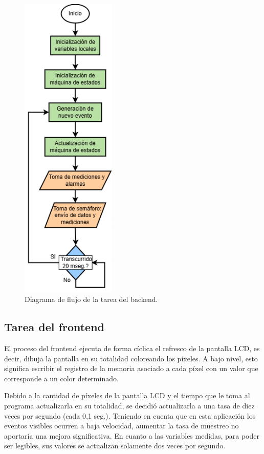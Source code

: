 \begin{figure}[H]
\centering
\includegraphics[width=0.4\textwidth]{./Figures/flowTaskApp.png}
\caption{Diagrama de flujo de la tarea del backend.}
\label{fig:taskApp}
\end{figure}

\subsection{Tarea del frontend}

El proceso del frontend ejecuta de forma cíclica el refresco de la pantalla LCD, es decir, dibuja la pantalla en su totalidad coloreando los píxeles. A bajo nivel, esto significa escribir el registro de la memoria asociado a cada píxel con un valor que corresponde a un color determinado. 

Debido a la cantidad de píxeles de la pantalla LCD y el tiempo que le toma al programa actualizarla en su totalidad, se decidió actualizarla a una tasa de diez veces por segundo (cada 0,1 seg.). Teniendo en cuenta que en esta aplicación los eventos visibles ocurren a baja velocidad, aumentar la tasa de muestreo no aportaría una mejora significativa. En cuanto a las variables medidas, para poder ser legibles, sus valores se actualizan solamente dos veces por segundo.

